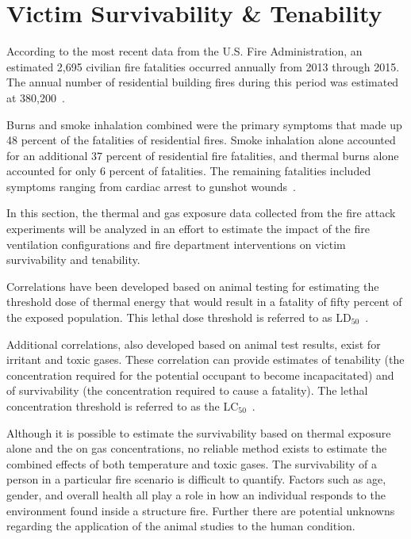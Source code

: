 \documentclass[12pt,oneside]{book}
\begin{document}
\section{Victim Survivability \& Tenability}

According to the most recent data from the U.S. Fire Administration, an estimated 2,695 civilian fire fatalities occurred annually from 2013 through 2015.  The annual number of residential building fires during this period was estimated at 380,200~\cite{USFA_Fire_Fatalities}.

Burns and smoke inhalation combined were the primary symptoms that made up 48 percent of the fatalities of residential fires.  Smoke inhalation alone accounted for an additional 37 percent of residential fire fatalities, and thermal burns alone accounted for only 6 percent of fatalities.  The remaining fatalities included symptoms ranging from cardiac arrest to gunshot wounds~\cite{USFA_Fire_Fatalities}.

In this section, the thermal and gas exposure data collected from the fire attack experiments will be analyzed in an effort to estimate the impact of the fire ventilation configurations and fire department interventions on victim survivability and tenability.

Correlations have been developed based on animal testing for estimating the threshold dose of thermal energy that would result in a fatality of fifty percent of the exposed population.  This lethal dose threshold is referred to as LD$_{50}$~\cite{SFPE:Purser}.  

Additional correlations, also developed based on animal test results, exist for irritant and toxic gases.  These correlation can provide estimates of tenability (the concentration required for the potential occupant to become incapacitated) and of survivability (the concentration required to cause a fatality). The lethal concentration threshold is referred to as the LC$_{50}$~\cite{SFPE:Purser}.

Although it is possible to estimate the survivability based on thermal exposure alone and the on gas concentrations, no reliable method exists to estimate the combined effects of both temperature and toxic gases. The survivability of a person in a particular fire scenario is difficult to quantify. Factors such as age, gender, and overall health all play a role in how an individual responds to the environment found inside a structure fire.  Further there are potential unknowns regarding the application of the animal studies to the human condition. 
\end{document}
